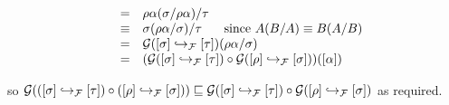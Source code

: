 \begin{enumerate}
\begin{enumerate}
\[\begin{array}{rcll}
      & = & \rho\alpha(\sigma/\rho\alpha)/\tau \\
      & \equiv & \sigma(\rho\alpha/\sigma)/\tau \hspace{.5cm}\text{ since $A(B/A) \equiv B(A/B)$} \\
      & = & \mathcal{G}({[\sigma]} \hookrightarrow_{\mathcal{F}} {[\tau]})(\rho\alpha/\sigma) \\
      & = & (\mathcal{G}({[\sigma]} \hookrightarrow_{\mathcal{F}} {[\tau]}) \circ \mathcal{G}({[\rho]} \hookrightarrow_{\mathcal{F}} {[\sigma]}))({[\alpha]})
      \end{array}
    \]
  \end{enumerate}
  so
  $\mathcal{G}(({[\sigma]} \hookrightarrow_{\mathcal{F}} {[\tau]}) \circ ({[\rho]} \hookrightarrow_{\mathcal{F}} {[\sigma]}))
  \sqsubseteq
  \mathcal{G}({[\sigma]} \hookrightarrow_{\mathcal{F}} {[\tau]}) \circ \mathcal{G}({[\rho]} \hookrightarrow_{\mathcal{F}} {[\sigma]})$
  as required.


\end{enumerate}
